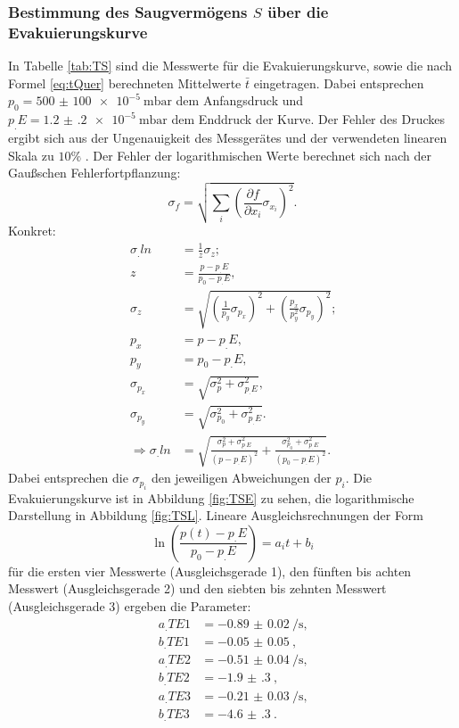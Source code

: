 \subsubsection{Bestimmung des Saugvermögens $S$ über die Evakuierungskurve}

In Tabelle \ref{tab:TS} sind die Messwerte für die Evakuierungskurve, sowie die nach Formel \eqref{eq:tQuer} berechneten Mittelwerte $\bar{t}$ eingetragen.
Dabei entsprechen $p_0=\SI{500(100)e-5}{\milli\bar}$ dem Anfangsdruck und $p_.E=\SI{1.2(2)e-5}{\milli\bar}$ dem Enddruck der Kurve. Der Fehler des Druckes ergibt sich aus der Ungenauigkeit des Messgerätes und der verwendeten linearen Skala zu $10\%$ \cite{V70}. 
Der Fehler der logarithmischen Werte berechnet sich nach der Gaußschen Fehlerfortpflanzung:
\[
\sigma_f = \sqrt{\sum_i\left(\frac{\partial f}{\partial x_i}\sigma_{x_i}\right)^2}\text{.}
\]
Konkret:
\begin{align}
\sigma_.{ln}	&=\frac{1}{z}\sigma_{z}\text{;}\\
z				&=\frac{p-p_.E}{p_0-p_.E}\text{,}\\
\sigma_{z}	&=\sqrt{\left(\frac{1}{p_y}\sigma_{p_x}\right)^2+\left(\frac{p_x}{p_y^2}\sigma_{p_y}\right)^2}\text{;}\\
p_x				&=p-p_.E\text{,}\\
p_y				&=p_0-p_.E\text{,}\\
\sigma_{p_x}	&=\sqrt{\sigma_p^2+\sigma_{p_.E}^2}\text{,}\\
\sigma_{p_y}	&=\sqrt{\sigma_{p_0}^2+\sigma_{p_.E}^2}\text{.}\\
\Rightarrow \sigma_.{ln}	&=\sqrt{\frac{\sigma_p^2+\sigma_{p_.E}^2}{(p-p_.E)^2}+\frac{\sigma_{p_0}^2+\sigma_{p_.E}^2}{(p_0-p_.E)^2}}\text{.} \label{eq:ln}
\end{align}
Dabei entsprechen die $\sigma_{p_i}$ den jeweiligen Abweichungen der $p_i$.
Die Evakuierungskurve ist in Abbildung \ref{fig:TSE} zu sehen, die logarithmische Darstellung in Abbildung \ref{fig:TSL}.
Lineare Ausgleichsrechnungen der Form
\[
\ln\left(\frac{p(t)-p_.E}{p_0-p_.E}\right) = a_it+b_i
\]
für die ersten vier Messwerte (Ausgleichsgerade 1), den fünften bis achten Messwert (Ausgleichsgerade 2) und den siebten bis zehnten Messwert (Ausgleichsgerade 3) ergeben die Parameter:
\begin{align*}
a_.{TE1} &= \SI{-0.89(2)}{\per\second} \text{,}\\
b_.{TE1} &= \SI{-0.05(5)}{} \text{,}\\
a_.{TE2} &= \SI{-0.51(4)}{\per\second} \text{,}\\
b_.{TE2} &= \SI{-1.9(3)}{} \text{,}\\
a_.{TE3} &= \SI{-0.21(3)}{\per\second} \text{,}\\
b_.{TE3} &= \SI{-4.6(3)}{} \text{.}\\
\end{align*} 
